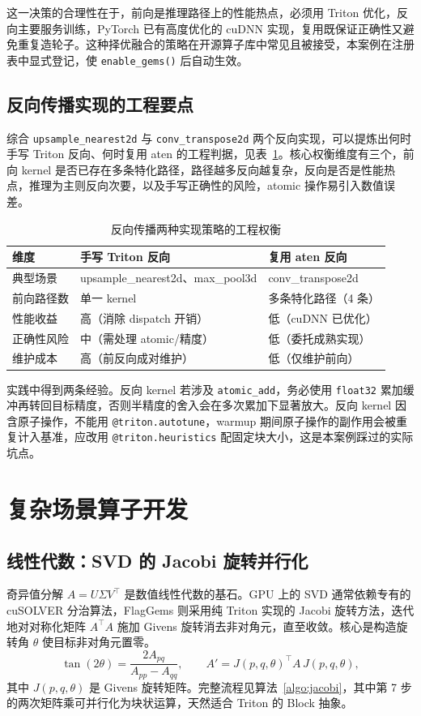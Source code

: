这一决策的合理性在于，前向是推理路径上的性能热点，必须用 Triton 优化，反向主要服务训练，PyTorch 已有高度优化的 cuDNN 实现，复用既保证正确性又避免重复造轮子。这种择优融合的策略在开源算子库中常见且被接受，本案例在注册表中显式登记，使 \texttt{enable\_gems()} 后自动生效。

\subsection{反向传播实现的工程要点}
综合 \texttt{upsample\_nearest2d} 与 \texttt{conv\_transpose2d} 两个反向实现，可以提炼出何时手写 Triton 反向、何时复用 aten 的工程判据，见表~\ref{tab:bwd}。核心权衡维度有三个，前向 kernel 是否已存在多条特化路径，路径越多反向越复杂，反向是否是性能热点，推理为主则反向次要，以及手写正确性的风险，atomic 操作易引入数值误差。

\begin{table}[!htbp]
\centering\small
\caption{反向传播两种实现策略的工程权衡}
\label{tab:bwd}
\renewcommand{\arraystretch}{1.15}
\begin{tabularx}{\textwidth}{p{2.2cm}XX}
\toprule
维度 & 手写 Triton 反向 & 复用 aten 反向 \\
\midrule
典型场景 & upsample\_nearest2d、max\_pool3d & conv\_transpose2d \\
前向路径数 & 单一 kernel & 多条特化路径（4 条） \\
性能收益 & 高（消除 dispatch 开销） & 低（cuDNN 已优化） \\
正确性风险 & 中（需处理 atomic/精度） & 低（委托成熟实现） \\
维护成本 & 高（前反向成对维护） & 低（仅维护前向） \\
\bottomrule
\end{tabularx}
\end{table}

实践中得到两条经验。反向 kernel 若涉及 \texttt{atomic\_add}，务必使用 \texttt{float32} 累加缓冲再转回目标精度，否则半精度的舍入会在多次累加下显著放大。反向 kernel 因含原子操作，不能用 \texttt{@triton.autotune}，warmup 期间原子操作的副作用会被重复计入基准，应改用 \texttt{@triton.heuristics} 配固定块大小，这是本案例踩过的实际坑点。

\section{复杂场景算子开发}

\subsection{线性代数：SVD 的 Jacobi 旋转并行化}
奇异值分解 $A = U\Sigma V^\top$ 是数值线性代数的基石。GPU 上的 SVD 通常依赖专有的 cuSOLVER 分治算法，FlagGems 则采用纯 Triton 实现的 Jacobi 旋转方法，迭代地对对称化矩阵 $A^\top A$ 施加 Givens 旋转消去非对角元，直至收敛。核心是构造旋转角 $\theta$ 使目标非对角元置零。
\[
\tan(2\theta) = \frac{2 A_{pq}}{A_{pp} - A_{qq}}, \qquad A' = J(p,q,\theta)^\top A\, J(p,q,\theta),
\]
其中 $J(p,q,\theta)$ 是 Givens 旋转矩阵。完整流程见算法~\ref{algo:jacobi}，其中第 7 步的两次矩阵乘可并行化为块状运算，天然适合 Triton 的 Block 抽象。

